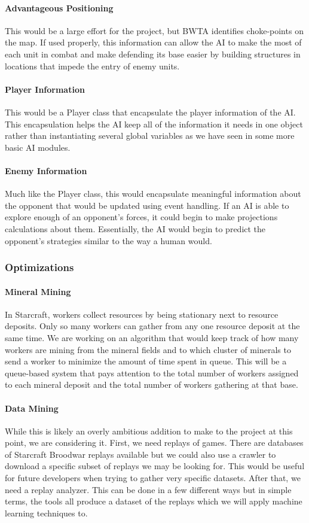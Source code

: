\documentclass[10pt,letterpaper,onecolumn,draftclsnofoot]{IEEEtran}
\begin{document}
	\paragraph{Advantageous Positioning}
	This would be a large effort for the project, but BWTA identifies choke-points on the map. If used properly, this information can allow the AI to make the most of each unit in combat and make defending its base easier by building structures in locations that impede the entry of enemy units.
	\paragraph{Player Information}
	This would be a Player class that encapsulate the player information of the AI. This encapsulation helps the AI keep all of the information it needs in one object rather than instantiating several global variables as we have seen in some more basic AI modules. 
	\paragraph{Enemy Information}
	Much like the Player class, this would encapsulate meaningful information about the opponent that would be updated using event handling. If an AI is able to explore enough of an opponent's forces, it could begin to make projections calculations about them. Essentially, the AI would begin to predict the opponent's strategies similar to the way a human would. 
	
	\subsubsection{Optimizations}
	\paragraph{Mineral Mining}
	In Starcraft, workers collect resources by being stationary next to resource deposits. Only so many workers can gather from any one resource deposit at the same time. We are working on an algorithm that would keep track of how many workers are mining from the mineral fields and to which cluster of minerals to send a worker to minimize the amount of time spent in queue. This will be a queue-based system that pays attention to the total number of workers assigned to each mineral deposit and the total number of workers gathering at that base. 
	\paragraph{Data Mining}
	While this is likely an overly ambitious addition to make to the project at this point, we are considering it. First, we need replays of games. There are databases of Starcraft Broodwar replays available but we could also use a crawler to download a specific subset of replays we may be looking for. This would be useful for future developers when trying to gather very specific datasets. After that, we need a replay analyzer. This can be done in a few different ways but in simple terms, the tools all produce a dataset of the replays which we will apply machine learning techniques to.
	
\end{document}
